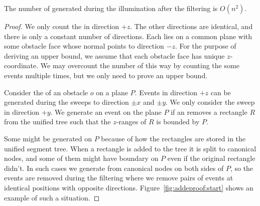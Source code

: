 \documentclass[english,gradu]{tktltiki2018}
\begin{document}
\begin{lem}\label{lem:adde3}The number of \addEs generated during the illumination after the filtering is $O(n^2)$.\end{lem}
\begin{proof}
We only count the \addEs in direction $+z$.
The other directions are identical, and there is only a constant number of directions.
Each \addE lies on a common plane with some obstacle face whose normal points to direction $-z$.
For the purpose of deriving an upper bound, we assume that each obstacle face has unique $z$-coordinate.
We may overcount the number of \addEs this way by counting the some events multiple times, but we only need to prove an upper bound.

Consider the \obsEs of an obstacle $o$ on a plane $P$.
Events in direction $+z$ can be generated during the sweeps to direction $\pm x$ and $\pm y$.
We only consider the sweep in direction $+y$.
We generate an event on the plane $P$ if an \obsE removes a rectangle $R$ from the unified tree such that the $z$-ranges of $R$ is bounded by $P$.

Some \addEs might be generated on $P$ because of how the rectangles are stored in the unified segment tree.
When a rectangle is added to the tree it is split to canonical nodes, and some of them might have boundary on $P$ even if the original rectangle didn't.
In such cases we generate \addEs from canonical nodes on both sides of $P$, so the events are removed during the filtering where we remove pairs of events at identical positions with opposite directions.
Figure~\ref{fig:addeproof:start} shows an example of such a situation.


\end{proof}
\end{document}
